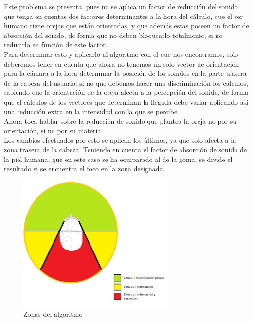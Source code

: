 \quad Este problema se presenta, pues no se aplica un factor de reducción del sonido que tenga en cuentas dos factores determinantes a la hora del cálculo, que el ser humano tiene orejas que están orientadas, y que además estas poseen un factor de absorción del sonido, de forma que no deben bloquearlo totalmente, si no reducirlo en función de este factor.\\

\quad Para determinar esto y aplicarlo al algoritmo con el que nos encontramos, solo deberemos tener en cuenta que ahora no tenemos un solo vector de orientación para la cámara a la hora determinar la posición de los sonidos en la parte trasera de la cabeza del usuario, si no que debemos hacer una discriminación  los cálculos, sabiendo que la orientación de la oreja afecta a la percepción del sonido, de forma que el cálculos de los vectores que determinan la llegada debe variar aplicando así una reducción extra en la intensidad con la que se percibe.\\

\quad Ahora toca hablar sobre la reducción de sonido que plantea la oreja no por su orientación, si no por su materia.\\

\quad Los cambios efectuados por esto se aplican los últimos, ya que solo afecta a la zona trasera de la cabeza. Teniendo en cuenta el factor de absorción de sonido de la piel humana, que en este caso se ha equiparado al de la goma, se divide el resultado si se encuentra el foco en la zona designada.\\


\begin{figure}[htb]
	\centering
	\includegraphics[width=0.7\textwidth]{./imagenes/zonasAlgoritmo}
	\caption{Zonas del algoritmo}
\end{figure}
\FloatBarrier

\newpage





